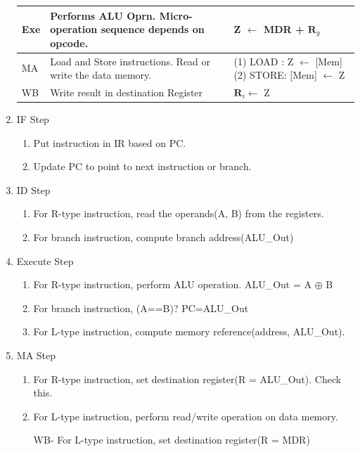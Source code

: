 \begin{enumerate}
\begin{myTableStyle}
\begin{tabular}{ |l|m{6cm}|m{8cm}| }
        Exe & Performs ALU Oprn. Micro-operation sequence depends on opcode.
            & Z \(\leftarrow\) MDR + {\large \( \boldsymbol R_y\)}  \\ \hline

        MA & Load and Store instructions. Read or write the data memory. & \makecell[l]{ (1) LOAD : Z \(\leftarrow\) [Mem]
                                           \\ (2) STORE: [Mem] \(\leftarrow\) Z } \\ \hline

        WB & Write result in destination Register &  {\large \( \boldsymbol R_i\)}\(\leftarrow\) Z \\ \hline
    \end{tabular} \end{myTableStyle} \vspace{0.08in}

    \newpage

    \item IF Step
    \begin{enumerate}
        \item Put instruction in IR based on PC.
        \item Update PC to point to next instruction or branch.
    \end{enumerate}

    \item ID Step
    \begin{enumerate}
        \item For R-type instruction, read the operands(A, B) from the registers.
        \item For branch instruction, compute branch address(ALU\_Out)
    \end{enumerate}

    \item Execute Step
    \begin{enumerate}
        \item For R-type instruction, perform ALU operation. ALU\_Out = A {\large \(\oplus\)} B
        \item For branch instruction, (A==B)? \; PC=ALU\_Out
        \item For L-type instruction, compute memory reference(address, ALU\_Out).
    \end{enumerate}

    \item MA Step
    \begin{enumerate}
        \item For R-type instruction, set destination register(R = ALU\_Out). Check this.
        \item For L-type instruction, perform read/write operation on data memory.
        \item[WB-] For L-type instruction, set destination register(R = MDR)
    \end{enumerate}


\end{enumerate}
